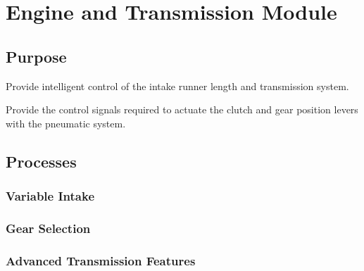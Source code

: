 \section{Engine and Transmission Module}


\subsection{Purpose}

Provide intelligent control of the intake runner length and transmission
system.

Provide the control signals required to actuate the clutch and gear
position levers with the pneumatic system.


\subsection{Processes}


\subsubsection{Variable Intake}


\subsubsection{Gear Selection}


\subsubsection{Advanced Transmission Features}


